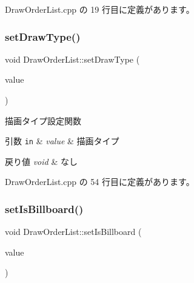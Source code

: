  Draw\+Order\+List.\+cpp の 19 行目に定義があります。

\mbox{\label{class_draw_order_list_a03d72a3943c45d19b70602ed7f526906}} 
\subsubsection{\texorpdfstring{set\+Draw\+Type()}{setDrawType()}}
{\footnotesize\ttfamily void Draw\+Order\+List\+::set\+Draw\+Type (\begin{DoxyParamCaption}\item[{\mbox{\hyperlink{class_draw_order_list_a6c9b9ceb312c16d399ef355f4f3486bb}{Draw\+Order\+List\+::\+Draw\+Type}}}]{value }\end{DoxyParamCaption})}



描画タイプ設定関数 


\begin{DoxyParams}[1]{引数}
\mbox{\tt in}  & {\em value} & 描画タイプ \\
\hline
\end{DoxyParams}

\begin{DoxyRetVals}{戻り値}
{\em void} & なし \\
\hline
\end{DoxyRetVals}


 Draw\+Order\+List.\+cpp の 54 行目に定義があります。

\mbox{\label{class_draw_order_list_a80a404e3308a92dcb9bfa3451518d14e}} 
\subsubsection{\texorpdfstring{set\+Is\+Billboard()}{setIsBillboard()}}
{\footnotesize\ttfamily void Draw\+Order\+List\+::set\+Is\+Billboard (\begin{DoxyParamCaption}\item[{bool}]{value }\end{DoxyParamCaption})}



